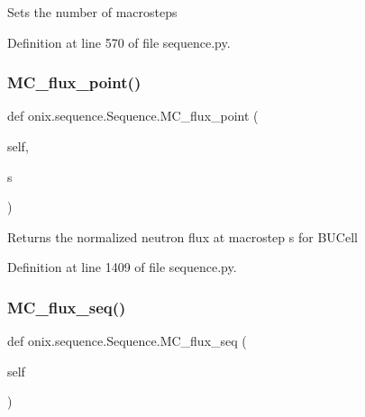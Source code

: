 \begin{DoxyVerb}Sets the number of macrosteps\end{DoxyVerb}
 

Definition at line 570 of file sequence.\+py.

\mbox{\label{classonix_1_1sequence_1_1Sequence_ac27e3151316ac349ee31d5eb4a773d4d}} 
\subsubsection{\texorpdfstring{M\+C\+\_\+flux\+\_\+point()}{MC\_flux\_point()}}
{\footnotesize\ttfamily def onix.\+sequence.\+Sequence.\+M\+C\+\_\+flux\+\_\+point (\begin{DoxyParamCaption}\item[{}]{self,  }\item[{}]{s }\end{DoxyParamCaption})}

\begin{DoxyVerb}Returns the normalized neutron flux at macrostep s for BUCell\end{DoxyVerb}
 

Definition at line 1409 of file sequence.\+py.

\mbox{\label{classonix_1_1sequence_1_1Sequence_a4abda8c26332657e46bf332c76e9016d}} 
\subsubsection{\texorpdfstring{M\+C\+\_\+flux\+\_\+seq()}{MC\_flux\_seq()}\hspace{0.1cm}{\footnotesize\ttfamily [1/2]}}
{\footnotesize\ttfamily def onix.\+sequence.\+Sequence.\+M\+C\+\_\+flux\+\_\+seq (\begin{DoxyParamCaption}\item[{}]{self }\end{DoxyParamCaption})}


